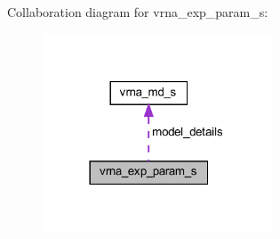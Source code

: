 Collaboration diagram for vrna\+\_\+exp\+\_\+param\+\_\+s\+:
\nopagebreak
\begin{figure}[H]
\begin{center}
\leavevmode
\includegraphics[width=194pt]{structvrna__exp__param__s__coll__graph}
\end{center}
\end{figure}
